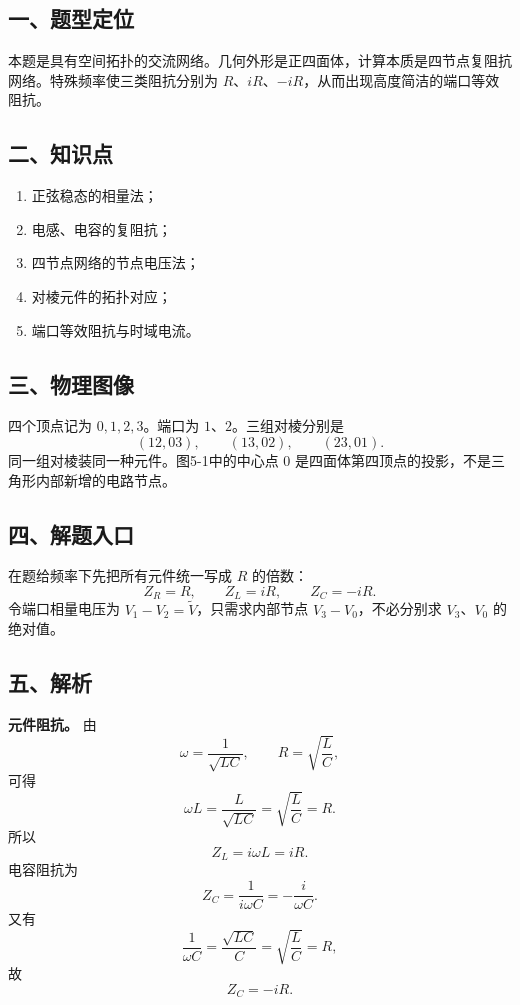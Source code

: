\documentclass[12pt,a4paper,UTF8]{ctexart}
\newcommand{\tightlist}{\setlength{\itemsep}{0pt}\setlength{\parskip}{0pt}}
\begin{document}
\subsection{一、题型定位}\label{ux4e00ux9898ux578bux5b9aux4f4d-4}

本题是具有空间拓扑的交流网络。几何外形是正四面体，计算本质是四节点复阻抗网络。特殊频率使三类阻抗分别为
\(R\)、\(iR\)、\(-iR\)，从而出现高度简洁的端口等效阻抗。

\subsection{二、知识点}\label{ux4e8cux77e5ux8bc6ux70b9-4}

\begin{enumerate}
\def\labelenumi{\arabic{enumi}.}
\tightlist
\item
  正弦稳态的相量法；
\item
  电感、电容的复阻抗；
\item
  四节点网络的节点电压法；
\item
  对棱元件的拓扑对应；
\item
  端口等效阻抗与时域电流。
\end{enumerate}

\subsection{三、物理图像}\label{ux4e09ux7269ux7406ux56feux50cf-4}

四个顶点记为 \(0,1,2,3\)。端口为 \(1\)、\(2\)。三组对棱分别是 \[
(12,03),\qquad(13,02),\qquad(23,01).
\] 同一组对棱装同一种元件。图5-1中的中心点 \(0\)
是四面体第四顶点的投影，不是三角形内部新增的电路节点。

\subsection{四、解题入口}\label{ux56dbux89e3ux9898ux5165ux53e3-4}

在题给频率下先把所有元件统一写成 \(R\) 的倍数： \[
Z_R=R,\qquad
Z_L=iR,\qquad
Z_C=-iR.
\] 令端口相量电压为 \(V_1-V_2=\widetilde V\)，只需求内部节点
\(V_3-V_0\)，不必分别求 \(V_3\)、\(V_0\) 的绝对值。

\subsection{五、解析}\label{ux4e94ux89e3ux6790-4}

\textbf{元件阻抗。} 由 \[
\omega=\frac1{\sqrt{LC}},
\qquad
R=\sqrt{\frac LC},
\] 可得 \[
\omega L
=\frac{L}{\sqrt{LC}}
=\sqrt{\frac LC}
=R. \tag{1}
\] 所以 \[
Z_L=i\omega L=iR. \tag{2}
\] 电容阻抗为 \[
Z_C=\frac1{i\omega C}
=-\frac{i}{\omega C}. \tag{3}
\] 又有 \[
\frac1{\omega C}
=\frac{\sqrt{LC}}{C}
=\sqrt{\frac LC}
=R,
\] 故 \[
Z_C=-iR. \tag{4}
\]
\end{document}

